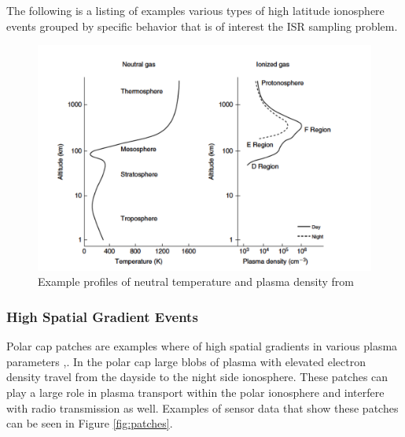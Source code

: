 The following is a listing of examples various types of high latitude ionosphere events grouped by specific behavior that is of interest the ISR sampling problem.

\begin{figure}[!t]
\centering
\includegraphics[width=5in]{altvsparams}
\caption{Example profiles of neutral temperature and plasma density from \cite{kellybook}}
\label{fig:singlefilt}
\end{figure}

\subsubsection{High Spatial Gradient Events}
Polar cap patches are examples where of high spatial gradients in various plasma parameters \cite{Dahlgren:2012dq},\cite{dahlgren2012di}.  In the polar cap large blobs of plasma with elevated electron density travel from the dayside to the night side ionosphere.  These patches can play a large role in plasma transport within the polar ionosphere and interfere with radio transmission as well.  Examples of sensor data that show these patches can be seen in Figure \ref{fig:patches}.

